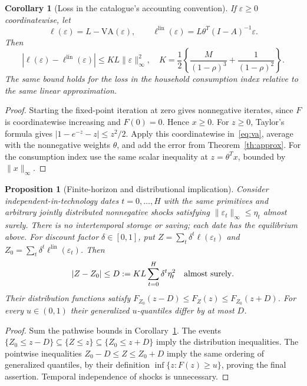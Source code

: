 \documentclass[11pt,a4paper]{article}
\newtheorem{proposition}[theorem]{Proposition}
\newtheorem{corollary}[theorem]{Corollary}
\theoremstyle{definition}
\theoremstyle{remark}
\begin{document}
\begin{corollary}[Loss in the catalogue's accounting convention]\label{co:loss}
If $\varepsilon\geq0$ coordinatewise, let
\[
 \ell(\varepsilon)=L-\mathrm{VA}(\varepsilon),\qquad
 \ell^{\mathrm{lin}}(\varepsilon)=L\theta^T(I-A)^{-1}\varepsilon.
\]
Then
\[
 \left|\ell(\varepsilon)-\ell^{\mathrm{lin}}(\varepsilon)\right|
 \leq KL\|\varepsilon\|_\infty^2,
 \quad K=\frac12\left\{\frac{M}{(1-\rho)^3}
                         +\frac1{(1-\rho)^2}\right\}.
\]
The same bound holds for the loss in the household consumption index relative to the same linear approximation.
\end{corollary}
\begin{proof}
Starting the fixed-point iteration at zero gives nonnegative iterates, since $F$ is coordinatewise increasing and $F(0)=0$. Hence $x\geq0$. For $z\geq0$, Taylor's formula gives $|1-e^{-z}-z|\leq z^2/2$. Apply this coordinatewise in~\eqref{eq:va}, average with the nonnegative weights $\theta$, and add the error from Theorem~\ref{th:approx}. For the consumption index use the same scalar inequality at $z=\theta^Tx$, bounded by $\|x\|_\infty$.
\end{proof}

\begin{proposition}[Finite-horizon and distributional implication]
Consider independent-in-technology dates $t=0,\ldots,H$ with the same primitives and arbitrary jointly distributed nonnegative shocks satisfying $\|\varepsilon_t\|_\infty\leq\eta_t$ almost surely. There is no intertemporal storage or saving; each date has the equilibrium above. For discount factor $\delta\in[0,1]$, put $Z=\sum_t\delta^t\ell(\varepsilon_t)$ and $Z_0=\sum_t\delta^t\ell^{\mathrm{lin}}(\varepsilon_t)$. Then
\[
 |Z-Z_0|\leq D:=KL\sum_{t=0}^H\delta^t\eta_t^2
 \quad\hbox{almost surely}.
\]
Their distribution functions satisfy $F_{Z_0}(z-D)\leq F_Z(z)\leq F_{Z_0}(z+D)$. For every $u\in(0,1)$ their generalized $u$-quantiles differ by at most $D$.
\end{proposition}
\begin{proof}
Sum the pathwise bounds in Corollary~\ref{co:loss}. The events $\{Z_0\leq z-D\}\subseteq\{Z\leq z\}\subseteq\{Z_0\leq z+D\}$ imply the distribution inequalities. The pointwise inequalities $Z_0-D\leq Z\leq Z_0+D$ imply the same ordering of generalized quantiles, by their definition $\inf\{z:F(z)\geq u\}$, proving the final assertion. Temporal independence of shocks is unnecessary.
\end{proof}
\end{document}
